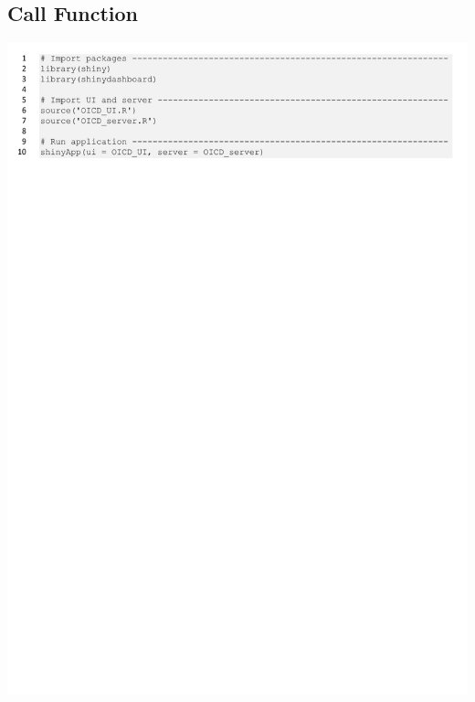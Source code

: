\hypertarget{call function}{} \subsection*{Call Function}
\begin{center}
    \includegraphics[scale=0.75, page = 1]{files/RUN.pdf}
\end{center}